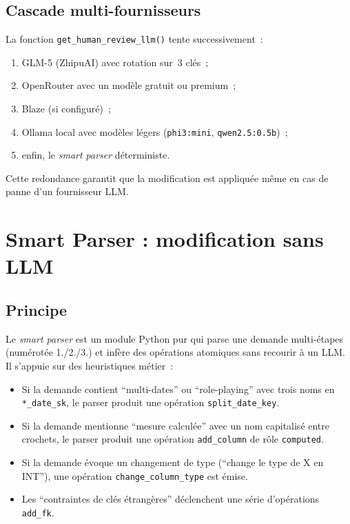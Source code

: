 \documentclass[12pt, a4paper]{report}
\begin{document}
\subsection{Cascade multi-fournisseurs}
La fonction \texttt{get\_human\_review\_llm()} tente successivement~:
\begin{enumerate}
  \item GLM-5 (ZhipuAI) avec rotation sur~3 clés~;
  \item OpenRouter avec un modèle gratuit ou premium~;
  \item Blaze (si configuré)~;
  \item Ollama local avec modèles légers (\texttt{phi3:mini},
        \texttt{qwen2.5:0.5b})~;
  \item enfin, le \emph{smart parser} déterministe.
\end{enumerate}
Cette redondance garantit que la modification est appliquée même en
cas de panne d'un fournisseur \ac{LLM}.

\section{Smart Parser : modification sans LLM}
\label{sec:smartparser}

\subsection{Principe}
Le \emph{smart parser} est un module Python pur qui parse une demande
multi-étapes (numérotée 1./2./3.) et infère des opérations atomiques
sans recourir à un \ac{LLM}. Il s'appuie sur des heuristiques
métier~:

\begin{itemize}
  \item Si la demande contient ``multi-dates'' ou ``role-playing''
        avec trois noms en \texttt{*\_date\_sk}, le parser produit
        une opération \texttt{split\_date\_key}.
  \item Si la demande mentionne ``mesure calculée'' avec un nom
        capitalisé entre crochets, le parser produit une opération
        \texttt{add\_column} de rôle \texttt{computed}.
  \item Si la demande évoque un changement de type
        (``change le type de X en INT''), une opération
        \texttt{change\_column\_type} est émise.
  \item Les ``contraintes de clés étrangères'' déclenchent une série
        d'opérations \texttt{add\_fk}.
\end{itemize}
\end{document}
